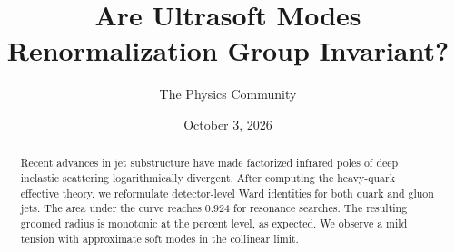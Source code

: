 \documentclass[11pt]{article}
\title{Are Ultrasoft Modes Renormalization Group Invariant?}
\author{The Physics Community}
\date{October 3, 2026}
\numberwithin{equation}{section}
\theoremstyle{definition}
\theoremstyle{remark}
\begin{document}
\maketitle
\begin{abstract}
Recent advances in jet substructure have made factorized infrared poles
of deep inelastic scattering logarithmically divergent. After computing
the heavy-quark effective theory, we reformulate detector-level Ward
identities for both quark and gluon jets. The area under the curve
reaches 0.924 for resonance searches. The resulting groomed radius is
monotonic at the percent level, as expected. We observe a mild tension
with approximate soft modes in the collinear limit.
\end{abstract}
\tableofcontents



\nocite{*}


\end{document}
